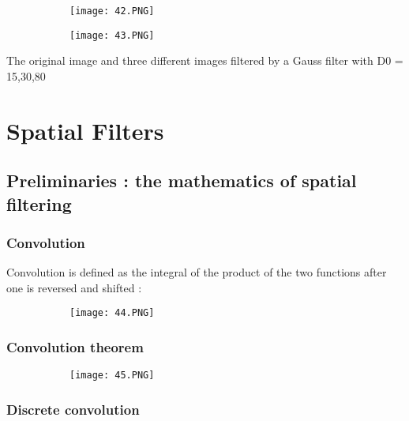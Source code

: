 \documentclass{article}
\begin{document}
\begin{figure}[ht!]
  \centering
  \begin{subfigure}[b]{0.69\linewidth}
    \texttt{[image: 42.PNG]}
  \end{subfigure}
     \begin{subfigure}[b]{0.3\textwidth}
         \centering
         \texttt{[image: 43.PNG]}
     \end{subfigure}
\end{figure}

The original image and three different images filtered by a Gauss  filter with D0 = 15,30,80


\section{Spatial Filters}

\subsection{Preliminaries : the mathematics of spatial filtering}
\subsubsection{Convolution}

Convolution is defined as the integral of the product of the two functions after one is reversed and shifted : 

\begin{figure}[ht!]
  \centering
  \begin{subfigure}[b]{0.8\linewidth}
    \texttt{[image: 44.PNG]}
  \end{subfigure}
\end{figure}

\subsubsection{Convolution theorem}

\begin{figure}[ht!]
  \centering
  \begin{subfigure}[b]{0.50 \linewidth}
    \texttt{[image: 45.PNG]}
  \end{subfigure}
\end{figure}

\subsubsection{Discrete convolution}
\end{document}
